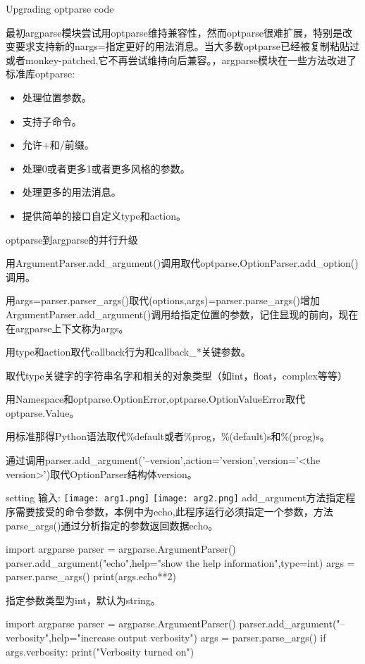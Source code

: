 Upgrading optparse code\par
最初argparse模块尝试用optparse维持兼容性，然而optparse很难扩展，特别是改变要求支持新的nargs=指定更好的用法消息。当大多数optparse已经被复制粘贴过或者monkey-patched,它不再尝试维持向后兼容。，argparse模块在一些方法改进了标准库optparse:
\begin{itemize}
\item 处理位置参数。
\item 支持子命令。
\item 允许+和/前缀。
\item 处理0或者更多1或者更多风格的参数。
\item 处理更多的用法消息。
\item 提供简单的接口自定义type和action。
\end{itemize}
optparse到argparse的并行升级
\begin{python}
\item 用ArgumentParser.add_argument()调用取代optparse.OptionParser.add_option()调用。
\item 用args=parser.parser_args()取代(options,args)=parser.parse_args()增加ArgumentParser.add_argument()调用给指定位置的参数，记住显现的前向，现在在argparse上下文称为args。
\item 用type和action取代callback行为和callback\_*关键参数。
\item 取代type关键字的字符串名字和相关的对象类型（如int，float，complex等等）
\item 用Namespace和optparse.OptionError,optparse.OptionValueError取代optparse.Value。
\item 用标准那得Python语法取代\%default或者\%prog，\%(default)s和\%(prog)s。
\item 通过调用parser.add\_argument('--version',action='version',version='<the version>')取代OptionParser结构体version。
\end{python}
setting
输入:\newline
\texttt{[image: arg1.png]}\newline
\texttt{[image: arg2.png]}\newline
add\_argument方法指定程序需要接受的命令参数，本例中为echo,此程序运行必须指定一个参数，方法parse\_args()通过分析指定的参数返回数据echo。
\begin{python}
import argparse
parser = argparse.ArgumentParser()
parser.add_argument("echo",help="show the help information",type=int)
args = parser.parse_args()
print(args.echo**2)
\end{python}
指定参数类型为int，默认为string。
\begin{python}
import argparse
parser = argparse.ArgumentParser()
parser.add_argument("--verbosity",help="increase output verbosity")
args = parser.parse_args()
if args.verbosity:
    print("Verbosity turned on")
\end{python}
